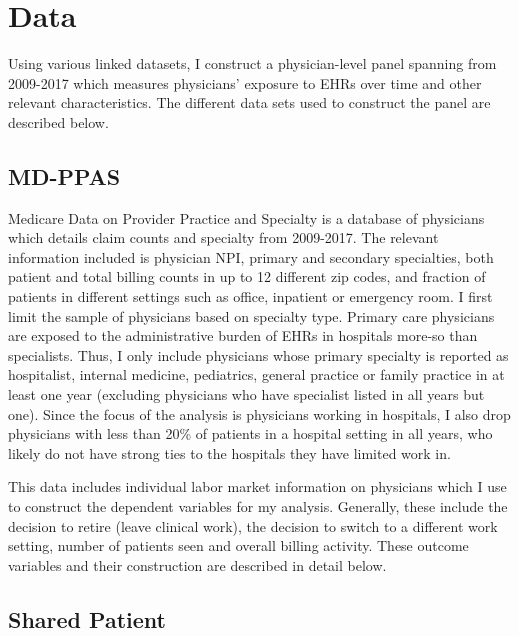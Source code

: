 \documentclass[11pt]{article}
\begin{document}
\section{Data}

Using various linked datasets, I construct a physician-level panel spanning from 2009-2017 which measures physicians' exposure to EHRs over time and other relevant characteristics. The different data sets used to construct the panel are described below.

\subsection{MD-PPAS}

Medicare Data on Provider Practice and Specialty is a database of physicians which details claim counts and specialty from 2009-2017. The relevant information included is physician NPI, primary and secondary specialties, both patient and total billing counts in up to 12 different zip codes, and fraction of patients in different settings such as office, inpatient or emergency room. I first limit the sample of physicians based on specialty type. Primary care physicians are exposed to the administrative burden of EHRs in hospitals more-so than specialists. Thus, I only include physicians whose primary specialty is reported as hospitalist, internal medicine, pediatrics, general practice or family practice in at least one year (excluding physicians who have specialist listed in all years but one). Since the focus of the analysis is physicians working in hospitals, I also drop physicians with less than 20\% of patients in a hospital setting in all years, who likely do not have strong ties to the hospitals they have limited work in.

This data includes individual labor market information on physicians which I use to construct the dependent variables for my analysis. Generally, these include the decision to retire (leave clinical work), the decision to switch to a different work setting, number of patients seen and overall billing activity. These outcome variables and their construction are described in detail below.


\subsection{Shared Patient}
\end{document}
